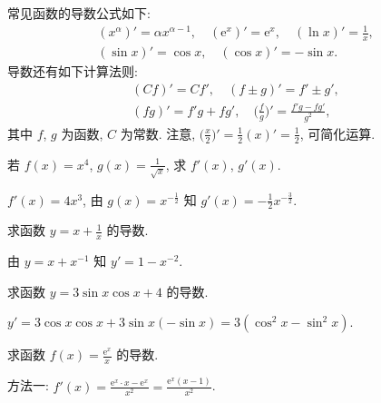   常见函数的导数公式如下:
  \begin{gather*}
    (x^\alpha)'= \alpha x^{\alpha-1},\quad
    (\mathrm{e}^x)'= \mathrm{e}^x,\quad
    (\ln x)'= \frac1x,                               \\
    (\sin x)'= \cos x,\quad  (\cos x)'= -\sin x.
  \end{gather*}
  导数还有如下计算法则:
  \begin{gather*}
    (Cf)'= Cf',\quad  (f\pm g)'= f'\pm g',\\
    (fg)'= f'g+fg',\quad  \Big(\frac{f}g\Big)'= \frac{f'g-fg'}{g^2},
  \end{gather*}
  其中 $f$, $g$ 为函数, $C$ 为常数. 注意, $\Big(\frac{x}2\Big)'= \frac12(x)'= \frac12$, 可简化运算.

  \lianxi
  \begin{exercise}
    若 $f(x)=x^4$, $g(x)=\frac1{\sqrt{x}}$, 求 $f'(x)$, $g'(x)$.
  \end{exercise}

  \beginsolution
    $f'(x)=4x^3$, 由 $g(x)=x^{-\frac12}$ 知 $g'(x)=-\frac12 x^{-\frac32}$.
  \endsolution
  
  \begin{exercise}
    求函数 $y=x+ \frac1x$ 的导数.
  \end{exercise}

  \beginsolution
    由 $y=x+x^{-1}$ 知 $y'=1-x^{-2}$.
  \endsolution
  
  \begin{exercise}
    求函数 $y=3\sin x\cos x+4$ 的导数.
  \end{exercise}

  \beginsolution
    $y'=3\cos x\cos x+3\sin x(-\sin x)= 3(\cos^2 x-\sin^2 x)$.
  \endsolution
  
  \begin{exercise}
    求函数 $f(x)= \frac{\mathrm{e}^x}x$ 的导数.
  \end{exercise}

  \beginsolution
    方法一: $f'(x)=\frac{\mathrm{e}^x\cdot x-\mathrm{e}^x}{x^2}
      = \frac{\mathrm{e}^x(x-1)}{x^2}$.
      
